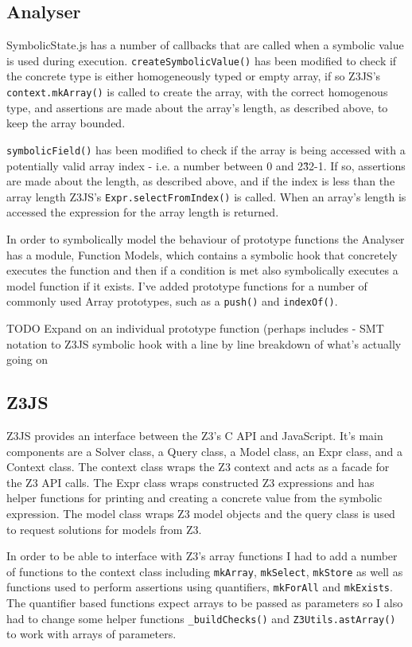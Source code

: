 \documentclass[]{final_report}
\begin{document}
\subsection{Analyser}
SymbolicState.js has a number of callbacks that are called when a symbolic value is used during execution. \lstinline{createSymbolicValue()} has been modified to check if the concrete type is either homogeneously typed or empty array, if so Z3JS’s \lstinline{context.mkArray()} is called to create the array, with the correct homogenous type, and assertions are made about the array’s length, as described above, to keep the array bounded. 

\lstinline{symbolicField()} has been modified to check if the array is being accessed with a potentially valid array index - i.e. a number between 0 and 2\^32-1. If so, assertions are made about the length, as described above, and if the index is less than the array length Z3JS’s \lstinline{Expr.selectFromIndex()} is called. When an array’s length is accessed the expression for the array length is returned.

In order to symbolically model the behaviour of prototype functions the Analyser has a module, Function Models, which contains a symbolic hook that concretely executes the function and then if a condition is met also symbolically executes a model function if it exists. I’ve added prototype functions for a number of commonly used Array prototypes, such as a \lstinline{push()} and \lstinline{indexOf()}.

TODO Expand on an individual prototype function (perhaps includes - SMT notation to Z3JS symbolic hook with a line by line breakdown of what’s actually going on

\subsection{Z3JS}
Z3JS provides an interface between the Z3’s C API and JavaScript. It’s main components are a Solver class, a Query class, a Model class, an Expr class, and a Context class. The context class wraps the Z3 context and acts as a facade for the Z3 API calls. The Expr class wraps constructed Z3 expressions and has helper functions for printing and creating a concrete value from the symbolic expression. The model class wraps Z3 model objects and the query class is used to request solutions for models from Z3.

In order to be able to interface with Z3’s array functions I had to add a number of functions to the context class including \lstinline{mkArray}, \lstinline{mkSelect}, \lstinline{mkStore} as well as functions used to perform assertions using quantifiers, \lstinline{mkForAll} and \lstinline{mkExists}. The quantifier based functions expect arrays to be passed as parameters so I also had to change some helper functions \lstinline{_buildChecks()} and \lstinline{Z3Utils.astArray()} to work with arrays of parameters.
\end{document}
